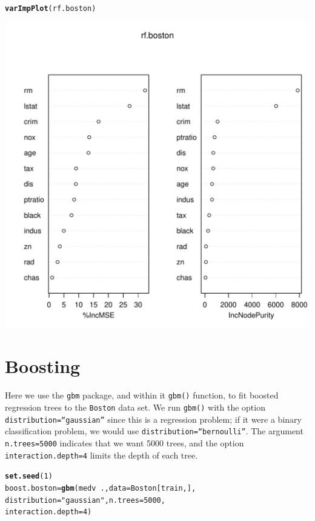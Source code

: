 \documentclass[12pt]{article}\usepackage[]{graphicx}\usepackage[]{color}
\makeatletter
\def\maxwidth{ %
  \ifdim\Gin@nat@width>\linewidth
    \linewidth
  \else
    \Gin@nat@width
  \fi
}
\newcommand{\hlnum}[1]{\textcolor[rgb]{0.686,0.059,0.569}{#1}}%
\newcommand{\hlstr}[1]{\textcolor[rgb]{0.192,0.494,0.8}{#1}}%
\newcommand{\hlopt}[1]{\textcolor[rgb]{0,0,0}{#1}}%
\newcommand{\hlstd}[1]{\textcolor[rgb]{0.345,0.345,0.345}{#1}}%
\newcommand{\hlkwb}[1]{\textcolor[rgb]{0.69,0.353,0.396}{#1}}%
\newcommand{\hlkwc}[1]{\textcolor[rgb]{0.333,0.667,0.333}{#1}}%
\newcommand{\hlkwd}[1]{\textcolor[rgb]{0.737,0.353,0.396}{\textbf{#1}}}%
\newenvironment{kframe}{%
 \def\at@end@of@kframe{}%
 \ifinner\ifhmode%
  \def\at@end@of@kframe{\end{minipage}}%
  \begin{minipage}{\columnwidth}%
 \fi\fi%
 \def\FrameCommand##1{\hskip\@totalleftmargin \hskip-\fboxsep
 \colorbox{shadecolor}{##1}\hskip-\fboxsep
     \hskip-\linewidth \hskip-\@totalleftmargin \hskip\columnwidth}%
 \MakeFramed {\advance\hsize-\width
   \@totalleftmargin\z@ \linewidth\hsize
   \@setminipage}}%
 {\par\unskip\endMakeFramed%
 \at@end@of@kframe}
\newenvironment{knitrout}{}{} %
\makeatother
\begin{document}
\begin{knitrout}
\color{fgcolor}\begin{kframe}
\begin{alltt}
\hlkwd{varImpPlot}\hlstd{(rf.boston)}
\end{alltt}
\end{kframe}
\includegraphics[width=\maxwidth]{figure/unnamed-chunk-23-1} 

\end{knitrout}

\newpage
\section{Boosting}

Here we use the \texttt{gbm} package, and within it \texttt{gbm()} function, to fit boosted regression trees to the \texttt{Boston} data set. We run \texttt{gbm()} with the option \texttt{distribution=``gaussian''} since this is a regression problem; if it were a binary classification problem, we would use \texttt{distribution=``bernoulli''}. The argument \texttt{n.trees=5000} indicates that we want 5000 trees, and the option \texttt{interaction.depth=4} limits the depth of each tree.

\begin{knitrout}
\color{fgcolor}\begin{kframe}
\begin{alltt}
\hlkwd{set.seed}\hlstd{(}\hlnum{1}\hlstd{)}
\hlstd{boost.boston}\hlkwb{=}\hlkwd{gbm}\hlstd{(medv}\hlopt{~}\hlstd{.,} \hlkwc{data}\hlstd{=Boston[train,],}
                 \hlkwc{distribution}\hlstd{=}\hlstr{"gaussian"}\hlstd{,} \hlkwc{n.trees}\hlstd{=}\hlnum{5000}\hlstd{,}
                 \hlkwc{interaction.depth}\hlstd{=}\hlnum{4}\hlstd{)}
\end{alltt}
\end{kframe}
\end{knitrout}
\end{document}
